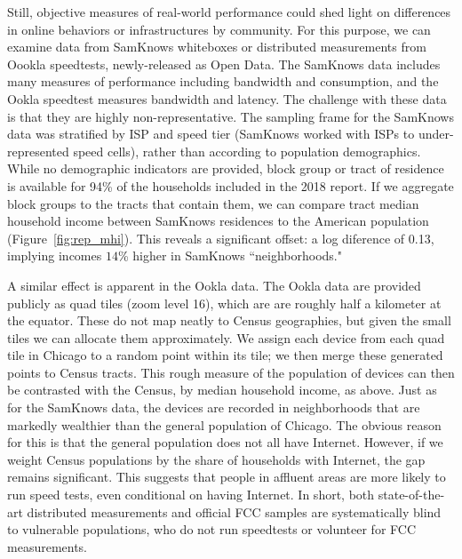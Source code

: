 \documentclass[11 pt]{amsart}
\begin{document}
Still, objective measures of real-world performance
could shed light on differences in online behaviors or
infrastructures by community.
For this purpose, we can examine data from SamKnows whiteboxes or
distributed measurements from Oookla speedtests, newly-released as Open Data.\cite{ookla}
The SamKnows data includes many measures of performance including bandwidth and consumption,
and the Ookla speedtest measures bandwidth and latency.
The challenge with these data is that they are highly non-representative.
The sampling frame for the SamKnows data was stratified by ISP and speed tier
(SamKnows worked with ISPs to under-represented speed cells),
rather than according to population demographics.\cite{samknows}
While no demographic indicators are provided,
block group or tract of residence is available for 94\% of the households included in the 2018 report.
If we aggregate block groups to the tracts that contain them,
we can compare tract median household income between SamKnows residences
to the American population (Figure~\ref{fig:rep_mhi}).
This reveals a significant offset:
a log diference of 0.13, implying incomes $14$\% higher in SamKnows ``neighborhoods."


A similar effect is apparent in the Ookla data.
The Ookla data are provided publicly as quad tiles (zoom level 16),
which are are roughly half a kilometer at the equator.
These do not map neatly to Census geographies,
but given the small tiles  we can allocate them approximately.
We assign each device from each quad tile in Chicago
to a random point within its tile;
we then merge these generated points to Census tracts.
This rough measure of the population of devices
can then be contrasted with the Census, by median household income, as above.
Just as for the SamKnows data, the devices are recorded in
neighborhoods that are markedly wealthier than the general population of Chicago.
The obvious reason for this is that the general population does not all have Internet.
However, if we weight Census populations by the share of households with Internet,
the gap remains significant.
This suggests that people in affluent areas are more likely to run speed tests,
even conditional on having Internet.
In short, both state-of-the-art
distributed measurements and official FCC samples
are systematically blind to vulnerable populations,
who do not run speedtests or volunteer for FCC measurements.
\end{document}
